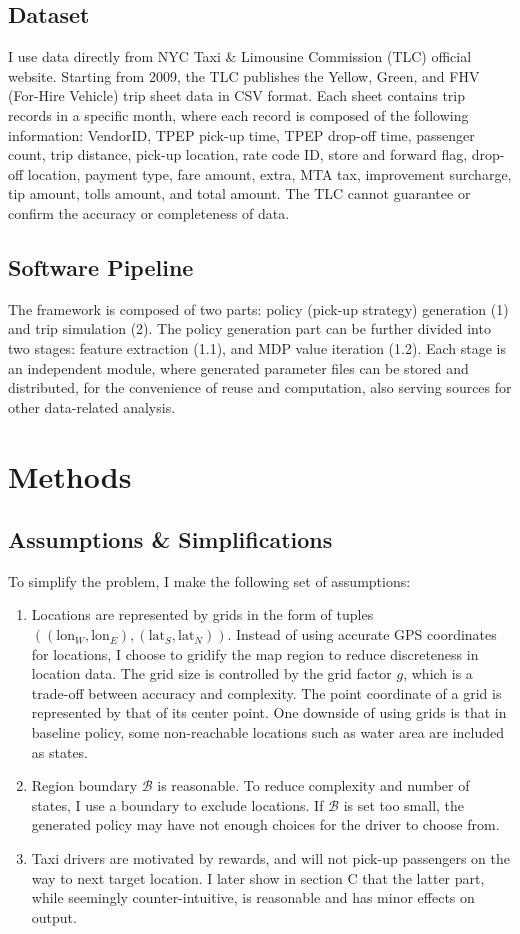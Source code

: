 \documentclass[letterpaper, 10 pt, conference]{ieeeconf}
\begin{document}
\subsection{Dataset}
I use data directly from NYC Taxi \& Limousine Commission (TLC) official website\cite{tlc}. Starting from 2009, the TLC publishes the Yellow, Green, and FHV (For-Hire Vehicle) trip sheet data in CSV format. Each sheet contains trip records in a specific month, where each record is composed of the following information: VendorID, TPEP pick-up time, TPEP drop-off time, passenger count, trip distance, pick-up location, rate code ID, store and forward flag, drop-off location, payment type, fare amount, extra, MTA tax, improvement surcharge, tip amount, tolls amount, and total amount\cite{rec}. The TLC cannot guarantee or confirm the accuracy or completeness of data. 
\subsection{Software Pipeline}
The framework is composed of two parts: policy (pick-up strategy) generation (1) and trip simulation (2). The policy generation part can be further divided into two stages: feature extraction (1.1), and MDP value iteration (1.2). Each stage is an independent module, where generated parameter files can be stored and distributed, for the convenience of reuse and computation, also serving sources for other data-related analysis. 
\section{Methods}
\subsection{Assumptions \& Simplifications}
To simplify the problem, I make the following set of assumptions:
\begin{enumerate}
\item Locations are represented by grids in the form of tuples $((\text{lon}_W, \text{lon}_E), (\text{lat}_S, \text{lat}_N))$. Instead of using accurate GPS coordinates for locations, I choose to gridify the map region to reduce discreteness in location data. The grid size is controlled by the grid factor $g$, which is a trade-off between accuracy and complexity. The point coordinate of a grid is represented by that of its center point. One downside of using grids is that in baseline policy, some non-reachable locations such as water area are included as states.
\item Region boundary $\mathcal{B}$ is reasonable. To reduce complexity and number of states, I use a boundary to exclude locations. If $\mathcal{B}$ is set too small, the generated policy may have not enough choices for the driver to choose from.
\item Taxi drivers are motivated by rewards, and will not pick-up passengers on the way to next target location. I later show in section C that the latter part, while seemingly counter-intuitive, is reasonable and has minor effects on output.
\end{enumerate}
\end{document}
